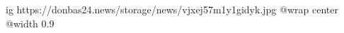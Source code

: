  
 
 
 
 

\ifcmt
  ig https://donbas24.news/storage/news/vjxej57m1y1gidyk.jpg
  @wrap center
  @width 0.9
\fi
